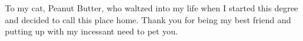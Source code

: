 \leavevmode\vfill
\begin{center}
To my cat, Peanut Butter, who waltzed into my life when I started this degree and decided to call this place home.
Thank you for being my best friend and putting up with my incessant need to pet you.
\end{center}
\vfill